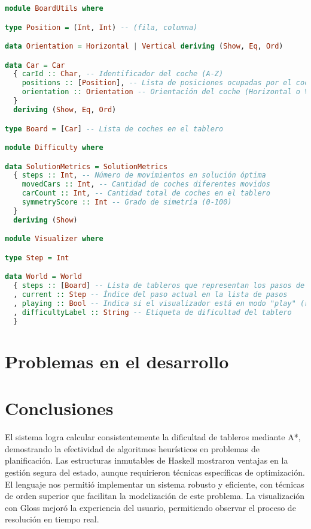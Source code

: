 \documentclass{article}
\begin{document}
\begin{lstlisting}[language=Haskell]
module BoardUtils where

type Position = (Int, Int) -- (fila, columna)

data Orientation = Horizontal | Vertical deriving (Show, Eq, Ord)

data Car = Car
  { carId :: Char, -- Identificador del coche (A-Z)
    positions :: [Position], -- Lista de posiciones ocupadas por el coche
    orientation :: Orientation -- Orientación del coche (Horizontal o Vertical)
  }
  deriving (Show, Eq, Ord)

type Board = [Car] -- Lista de coches en el tablero

module Difficulty where

data SolutionMetrics = SolutionMetrics
  { steps :: Int, -- Número de movimientos en solución óptima
    movedCars :: Int, -- Cantidad de coches diferentes movidos
    carCount :: Int, -- Cantidad total de coches en el tablero
    symmetryScore :: Int -- Grado de simetría (0-100)
  }
  deriving (Show)

module Visualizer where

type Step = Int

data World = World
  { steps :: [Board] -- Lista de tableros que representan los pasos de la solución
  , current :: Step -- Índice del paso actual en la lista de pasos
  , playing :: Bool -- Indica si el visualizador está en modo "play" (reproducción automática)
  , difficultyLabel :: String -- Etiqueta de dificultad del tablero
  }
\end{lstlisting}

\section*{Problemas en el desarrollo}


\section*{Conclusiones}
El sistema logra calcular consistentemente la dificultad de tableros mediante A*, demostrando la efectividad de algoritmos heurísticos en problemas de planificación. Las estructuras inmutables de Haskell mostraron ventajas en la gestión segura del estado, aunque requirieron técnicas específicas de optimización. El lenguaje nos permitió implementar un sistema robusto y eficiente, con técnicas de orden superior que facilitan la modelización de este problema. La visualización con Gloss mejoró la experiencia del usuario, permitiendo observar el proceso de resolución en tiempo real.
\end{document}
